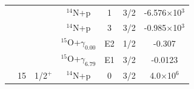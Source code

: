 \begin{table}[]
\begin{center}
\begin{threeparttable}
\begin{tabular}{c  c  c  c  c  c  c}
	&	&	&	$^{14}$N+p	&	1	&	3/2	&	{-6.576$\times$10$^3$}\\
	&	&	&	$^{14}$N+p	&	3	&	3/2	&	{-0.985$\times$10$^3$}\\
	&	&	&	$^{15}$O+$\gamma_{0.00}$	&	E2	&	1/2	&	{-0.307}\\
	&	&	&	$^{15}$O+$\gamma_{6.79}$	&	E1	&	3/2	&	{-0.0123}\\
& {15}	&	1/2$^+$	&	$^{14}$N+p	&	0	&	3/2	&	{4.0$\times$10$^6$}\\

\end{tabular}
\end{threeparttable}
\end{center}
\end{table}
